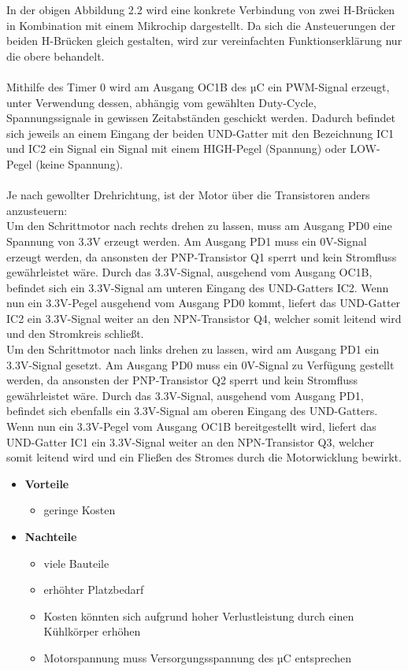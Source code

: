 In der obigen Abbildung 2.2 wird eine konkrete Verbindung von zwei H-Brücken in Kombination mit einem Mikrochip dargestellt.
Da sich die Ansteuerungen der beiden H-Brücken gleich gestalten, wird zur vereinfachten Funktionserklärung nur die obere behandelt. \\\\
Mithilfe des Timer 0 wird am Ausgang OC1B des \acs{µC} ein PWM-Signal erzeugt, unter Verwendung dessen,
abhängig vom gewählten Duty-Cycle, Spannungssignale in gewissen Zeitabständen geschickt werden.
Dadurch befindet sich jeweils an einem Eingang der beiden UND-Gatter mit den Bezeichnung IC1 und IC2 ein Signal ein Signal mit einem HIGH-Pegel (Spannung) oder LOW-Pegel (keine Spannung). \\\\
Je nach gewollter Drehrichtung, ist der Motor über die Transistoren anders anzusteuern: \\
Um den Schrittmotor nach rechts drehen zu lassen, muss am Ausgang PD0 eine Spannung von 3.3V erzeugt werden.
Am Ausgang PD1 muss ein 0V-Signal erzeugt werden, da ansonsten der PNP-Transistor Q1 sperrt und kein Stromfluss gewährleistet wäre.
Durch das 3.3V-Signal, ausgehend vom Ausgang OC1B, befindet sich ein 3.3V-Signal am unteren Eingang des UND-Gatters IC2.
Wenn nun ein 3.3V-Pegel ausgehend vom Ausgang PD0 kommt, liefert das UND-Gatter IC2 ein 3.3V-Signal weiter an den NPN-Transistor Q4, welcher somit leitend wird und den Stromkreis schließt. \\
Um den Schrittmotor nach links drehen zu lassen, wird am Ausgang PD1 ein 3.3V-Signal gesetzt.
Am Ausgang PD0 muss ein 0V-Signal zu Verfügung gestellt werden, da ansonsten der PNP-Transistor Q2 sperrt und kein Stromfluss gewährleistet wäre.
Durch das 3.3V-Signal, ausgehend vom Ausgang PD1, befindet sich ebenfalls ein 3.3V-Signal am oberen Eingang des UND-Gatters.
Wenn nun ein 3.3V-Pegel vom Ausgang OC1B bereitgestellt wird, liefert das UND-Gatter IC1 ein 3.3V-Signal weiter an den NPN-Transistor Q3, welcher somit leitend wird und
ein Fließen des Stromes durch die Motorwicklung bewirkt.

\begin{itemize}
    \item \textbf{Vorteile}
    \begin{itemize}
        \item geringe Kosten
    \end{itemize}
    \item \textbf{Nachteile}
    \begin{itemize}
        \item viele Bauteile
        \item erhöhter Platzbedarf
        \item Kosten könnten sich aufgrund hoher Verlustleistung durch einen Kühlkörper erhöhen
        \item Motorspannung muss Versorgungsspannung des µC entsprechen
    \end{itemize}
\end{itemize}

